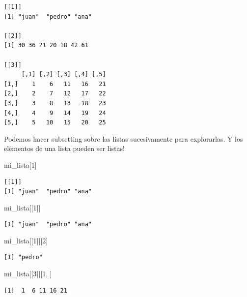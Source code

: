 \documentclass[
  letterpaper,
  DIV=11,
  numbers=noendperiod]{scrartcl}
\newenvironment{Shaded}{\begin{snugshade}}{\end{snugshade}}
\newcommand{\DecValTok}[1]{\textcolor[rgb]{0.68,0.00,0.00}{#1}}
\newcommand{\NormalTok}[1]{\textcolor[rgb]{0.00,0.23,0.31}{#1}}
\begin{document}
\begin{verbatim}
[[1]]
[1] "juan"  "pedro" "ana"  

[[2]]
[1] 30 36 21 20 18 42 61

[[3]]
     [,1] [,2] [,3] [,4] [,5]
[1,]    1    6   11   16   21
[2,]    2    7   12   17   22
[3,]    3    8   13   18   23
[4,]    4    9   14   19   24
[5,]    5   10   15   20   25
\end{verbatim}

Podemos hacer subsetting sobre las listas sucesivamente para
explorarlas. Y los elementos de una lista pueden ser listas!

\begin{Shaded}
\begin{Highlighting}[]
\NormalTok{mi\_lista[}\DecValTok{1}\NormalTok{] }
\end{Highlighting}
\end{Shaded}

\begin{verbatim}
[[1]]
[1] "juan"  "pedro" "ana"  
\end{verbatim}

\begin{Shaded}
\begin{Highlighting}[]
\NormalTok{mi\_lista[[}\DecValTok{1}\NormalTok{]] }
\end{Highlighting}
\end{Shaded}

\begin{verbatim}
[1] "juan"  "pedro" "ana"  
\end{verbatim}

\begin{Shaded}
\begin{Highlighting}[]
\NormalTok{mi\_lista[[}\DecValTok{1}\NormalTok{]][}\DecValTok{2}\NormalTok{] }
\end{Highlighting}
\end{Shaded}

\begin{verbatim}
[1] "pedro"
\end{verbatim}

\begin{Shaded}
\begin{Highlighting}[]
\NormalTok{mi\_lista[[}\DecValTok{3}\NormalTok{]][}\DecValTok{1}\NormalTok{, ]}
\end{Highlighting}
\end{Shaded}

\begin{verbatim}
[1]  1  6 11 16 21
\end{verbatim}
\end{document}
